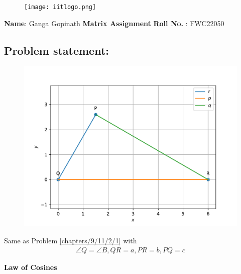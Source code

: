 \documentclass[10pt,a4paper]{article}
\begin{document}
\begin{figure}[!tbp]
 \centering
  \begin{minipage}[b]{0.4\textwidth}
  \texttt{[image: iitlogo.png]} 
  \end{minipage}
\end{figure}
\raggedright \textbf{Name}:\hspace{1mm} Ganga Gopinath\hspace{3cm} \Large \textbf{Matrix Assignment}\hspace{2.5cm} %
\normalsize \textbf{Roll No.} :\hspace{1mm} FWC22050\vspace{1cm}
\begin{multicols}{2}
\section{Problem statement:}
\fi
	\begin{figure}[!h]
		\centering
 \includegraphics[width=\columnwidth]{chapters/9/11/2/3/figs/line1.pdf}
		\caption{}
		\label{fig:9/11/2/3}
  	\end{figure}
	\solution  Same as Problem 
\ref{chapters/9/11/2/1} with 
\begin{align}
\angle Q = \angle B, QR = a, PR = b, PQ = c
\end{align}
\iffalse

\textbf{Law of Cosines}
\vspace{2mm}\raggedright \\


\end{multicols}
\end{document}

